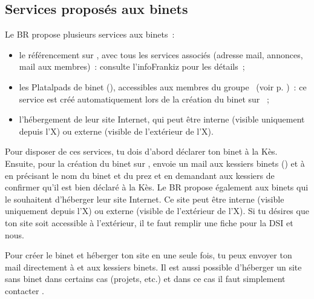 \subsection{Services proposés aux binets}

Le BR propose plusieurs services aux binets~:
\begin{itemize}
\item le référencement sur \fkz, avec tous les services associés (adresse mail, annonces, mail aux membres)~: consulte l'infoFrankiz pour les détails~;
\item les Platalpads de binet (), accessibles aux membres du groupe \fkz\ (voir p. \pageref{platalpad})~: ce service est créé automatiquement lors de la création du binet sur \fkz~;
\item l'hébergement de leur site Internet, qui peut être interne (visible uniquement depuis l'X) ou externe (visible de l'extérieur de l'X).\\
\end{itemize}

Pour disposer de ces services, tu dois d'abord déclarer ton binet à la Kès. Ensuite, pour la création du binet sur \fkz,
envoie un mail aux kessiers binets () et à  en précisant le nom du binet et du prez et en demandant aux kessiers de confirmer qu'il est bien déclaré à la Kès.
\vspace{4mm}
Le BR propose également aux binets qui le souhaitent d'héberger leur site Internet. Ce site peut être interne (visible uniquement depuis l'X) ou externe (visible de l'extérieur de l'X). Si tu désires que ton site soit accessible à l'extérieur, il te faut remplir une fiche pour la DSI et nous.

Pour créer le binet et héberger ton site en une seule fois, tu peux envoyer ton mail directement à  et aux kessiers binets.
Il est aussi possible d'héberger un site sans binet dans certains cas (projets, etc.) et dans ce cas il faut simplement contacter .

